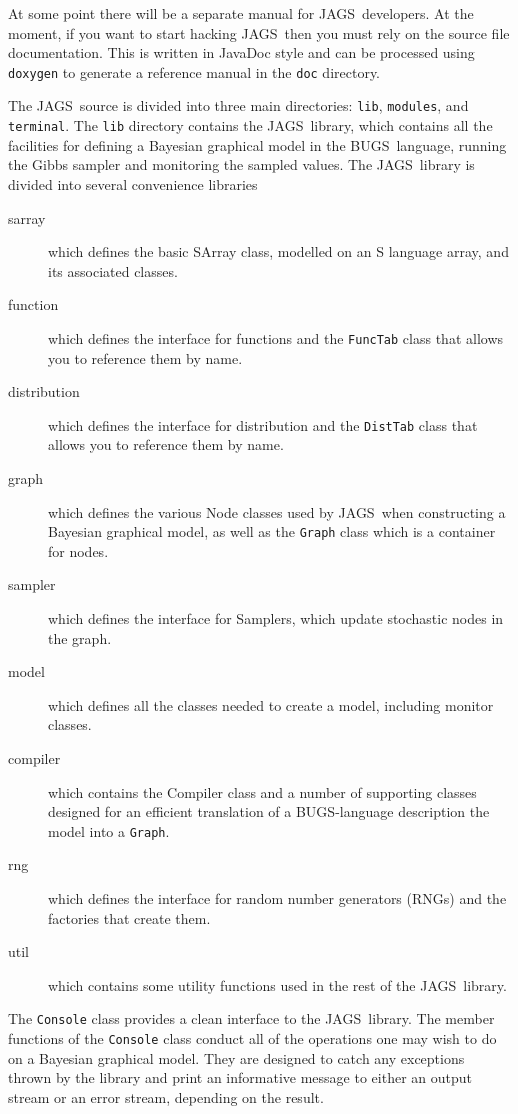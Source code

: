 \documentclass[11pt, a4paper, titlepage]{report}
\newcommand{\JAGS}{\textsf{JAGS}}
\newcommand{\BUGS}{\textsf{BUGS}}
\begin{document}
At some point there will be a separate manual for \JAGS\ developers.
At the moment, if you want to start hacking \JAGS\ then you must rely
on the source file documentation.  This is written in JavaDoc style
and can be processed using \texttt{doxygen} to generate a reference
manual in the \texttt{doc} directory.

The \JAGS\ source is divided into three main directories:
\texttt{lib}, \texttt{modules}, and \texttt{terminal}. The
\texttt{lib} directory contains the \JAGS\ library, which contains all
the facilities for defining a Bayesian graphical model in the \BUGS\
language, running the Gibbs sampler and monitoring the sampled
values. The \JAGS\ library is divided into several convenience
libraries
\begin{description}
\item[sarray] which defines the basic SArray class, modelled on an
\textsf{S} language array, and its associated classes.
\item[function] which defines the interface for functions and
the \texttt{FuncTab} class that allows you to reference them by name.
\item[distribution] which defines the interface for distribution and
the \texttt{DistTab} class that allows you to reference them by name.
\item[graph] which defines the various Node classes used by \JAGS\
when constructing a Bayesian graphical model, as well as the \texttt{Graph}
class which is a container for nodes.
\item[sampler] which defines the interface for Samplers, which update
stochastic nodes in the graph.
\item[model] which defines all the classes needed to create a model,
including monitor classes.
\item[compiler] which contains the Compiler class and a number of 
supporting classes designed for an efficient translation of a BUGS-language
description the model into a \texttt{Graph}.
\item[rng] which defines the interface for random number generators (RNGs)
and the factories that create them.
\item[util] which contains some utility functions used in the rest of
the \JAGS\ library.
\end{description}
The \texttt{Console} class provides a clean interface to the \JAGS\
library.  The member functions of the \texttt{Console} class conduct
all of the operations one may wish to do on a Bayesian graphical
model.  They are designed to catch any exceptions thrown by the
library and print an informative message to either an output stream or
an error stream, depending on the result.
\end{document}
